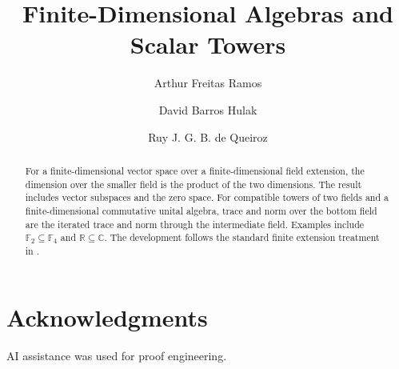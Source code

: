 \documentclass[11pt,a4paper]{article}
\begin{document}
\title{Finite-Dimensional Algebras and Scalar Towers}
\author{Arthur Freitas Ramos \and David Barros Hulak \and Ruy J. G. B. de Queiroz}
\maketitle

\begin{abstract}
For a finite-dimensional vector space over a finite-dimensional field extension, the
dimension over the smaller field is the product of the two dimensions.
The result includes vector subspaces and the zero space.  For compatible towers of two fields and a finite-dimensional commutative
unital algebra, trace and norm over the bottom field are the iterated trace
and norm through the intermediate field.  Examples
include $\mathbb F_2\subseteq\mathbb F_4$ and
$\mathbb R\subseteq\mathbb C$.  The development follows the standard finite
extension treatment in \cite{Lang2002}.
\end{abstract}

\begingroup
\small
\tableofcontents
\endgroup



\section*{Acknowledgments}
AI assistance was used for proof engineering. 



\end{document}
